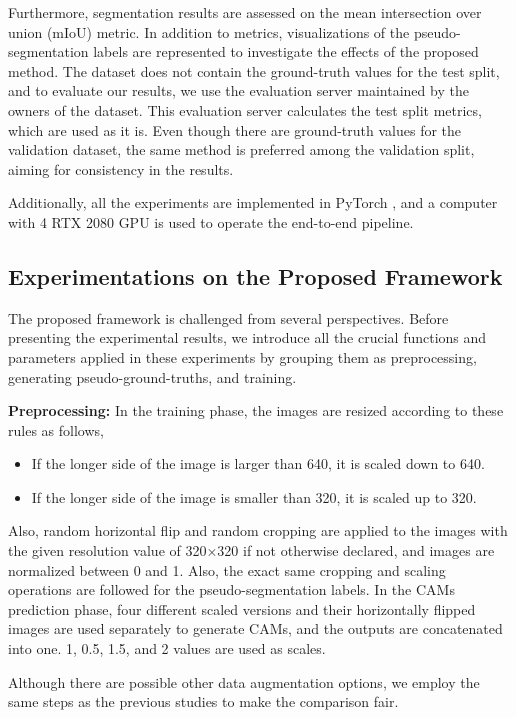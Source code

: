 \documentclass[sn-mathphys]{sn-jnl}
\theoremstyle{thmstyleone}
\theoremstyle{thmstyletwo}\newtheorem{example}{Example}\newtheorem{remark}{Remark}
\theoremstyle{thmstylethree}\newtheorem{definition}{Definition}
\begin{document}
Furthermore, segmentation results are assessed on the mean intersection over union (mIoU) metric. In addition to metrics, visualizations of the pseudo-segmentation labels are represented to investigate the effects of the proposed method. The dataset does not contain the ground-truth values for the test split, and to evaluate our results, we use the evaluation server maintained by the owners of the dataset. This evaluation server calculates the test split metrics, which are used as it is. Even though there are ground-truth values for the validation dataset, the same method is preferred among the validation split, aiming for consistency in the results.

Additionally, all the experiments are implemented in PyTorch \cite{NEURIPS2019_9015}, and a computer with 4 RTX 2080 GPU is used to operate the end-to-end pipeline.

\subsection{Experimentations on the Proposed Framework}

The proposed framework is challenged from several perspectives. Before presenting the experimental results, we introduce all the crucial functions and parameters applied in these experiments by grouping them as preprocessing, generating pseudo-ground-truths, and training.

\textbf{Preprocessing:} In the training phase, the images are resized according to these rules as follows,
\begin{itemize}
    \item If the longer side of the image is larger than 640, it is scaled down to 640.
    \item If the longer side of the image is smaller than 320, it is scaled up to 320.
\end{itemize}

Also, random horizontal flip and random cropping are applied to the images with the given resolution value of 320×320 if not otherwise declared, and images are normalized between 0 and 1. Also, the exact same cropping and scaling operations are followed for the pseudo-segmentation labels. In the CAMs prediction phase, four different scaled versions and their horizontally flipped images are used separately to generate CAMs, and the outputs are concatenated into one. 1, 0.5, 1.5, and 2 values are used as scales. 

Although there are possible other data augmentation options, we employ the same steps as the previous studies to make the comparison fair. 
\end{document}
